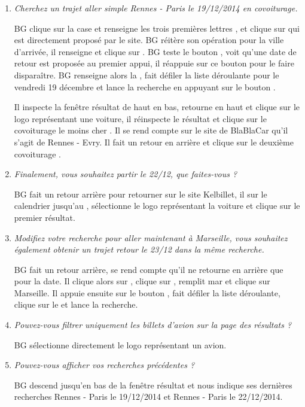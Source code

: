 \begin{enumerate}
\item \textit{Cherchez un trajet aller simple Rennes - Paris le 19/12/2014 en covoiturage.}

BG clique sur la case  et renseigne les trois premi\`{e}res lettres , et clique sur  qui est directement propos\'{e} par le site. BG r\'{e}it\`{e}re son op\'{e}ration pour la ville d'arriv\'{e}e, il renseigne  et clique sur .
BG teste le bouton , voit qu'une date de retour est propos\'{e}e au premier appui, il r\'{e}appuie sur ce bouton pour le faire dispara\^{i}tre. BG renseigne alors la , fait d\'{e}filer la liste d\'{e}roulante pour le vendredi 19 d\'{e}cembre et lance la recherche en appuyant sur le bouton .

Il inspecte la fen\^{e}tre r\'{e}sultat de haut en bas, retourne en haut et clique sur le logo repr\'{e}sentant une voiture, il r\'{e}inspecte le r\'{e}sultat et clique sur le covoiturage le moins cher . Il se rend compte sur le site de BlaBlaCar qu'il s'agit de Rennes - Evry. Il fait un retour en arri\`{e}re et clique sur le deuxi\`{e}me covoiturage .


\item \textit{Finalement, vous souhaitez partir le 22/12, que faites-vous ?} 

BG fait un retour arri\`{e}re pour retourner sur le site Kelbillet, il  sur le calendrier jusqu'au , s\'{e}lectionne le logo repr\'{e}sentant la voiture et clique sur le premier r\'{e}sultat.


\item \textit{Modifiez votre recherche pour aller maintenant \`{a} Marseille, vous souhaitez \'{e}galement obtenir un trajet retour le 23/12 dans la m\^{e}me recherche.}

BG fait un retour arri\`{e}re, se rend compte qu'il ne retourne en arri\`{e}re que pour la date. Il clique alors sur , clique sur , remplit {mar} et clique sur {Marseille}. Il appuie ensuite sur le bouton , fait d\'{e}filer la liste d\'{e}roulante, clique sur le  et lance la recherche.


\item \textit{Pouvez-vous filtrer uniquement les billets d'avion sur la page des r\'{e}sultats ?}

BG s\'{e}lectionne directement le logo repr\'{e}sentant un avion.

\item \textit{Pouvez-vous afficher vos recherches pr\'{e}c\'{e}dentes ?}

BG descend jusqu'en bas de la fen\^{e}tre r\'{e}sultat et nous indique ses derni\`{e}res recherches {Rennes - Paris le 19/12/2014} et {Rennes - Paris le 22/12/2014}.


\end{enumerate}

